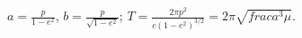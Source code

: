 $a=\frac{p}{1-e^2}$, $b=\frac{p}{\sqrt{1-e^2}}$; $T=\frac{2\pi p^2}{c(1-e^2)^{3/2}}=2\pi \sqrt{frac{a^3}{\mu}}$.
